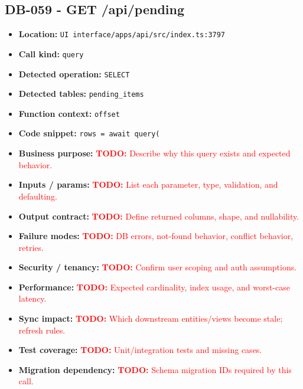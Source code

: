 \documentclass[11pt]{article}
\newcommand{\todoitem}[1]{\textcolor{red}{\textbf{TODO:} #1}}
\begin{document}
\subsection{DB-059 - GET /api/pending}
\begin{itemize}[leftmargin=1.5em]
\item \textbf{Location:} \texttt{UI interface/apps/api/src/index.ts:3797}
\item \textbf{Call kind:} \texttt{query}
\item \textbf{Detected operation:} \texttt{SELECT}
\item \textbf{Detected tables:} \texttt{pending\_items}
\item \textbf{Function context:} \texttt{offset}
\item \textbf{Code snippet:} \texttt{rows = await query(}
\item \textbf{Business purpose:} \todoitem{Describe why this query exists and expected behavior.}
\item \textbf{Inputs / params:} \todoitem{List each parameter, type, validation, and defaulting.}
\item \textbf{Output contract:} \todoitem{Define returned columns, shape, and nullability.}
\item \textbf{Failure modes:} \todoitem{DB errors, not-found behavior, conflict behavior, retries.}
\item \textbf{Security / tenancy:} \todoitem{Confirm user scoping and auth assumptions.}
\item \textbf{Performance:} \todoitem{Expected cardinality, index usage, and worst-case latency.}
\item \textbf{Sync impact:} \todoitem{Which downstream entities/views become stale; refresh rules.}
\item \textbf{Test coverage:} \todoitem{Unit/integration tests and missing cases.}
\item \textbf{Migration dependency:} \todoitem{Schema migration IDs required by this call.}
\end{itemize}
\end{document}
